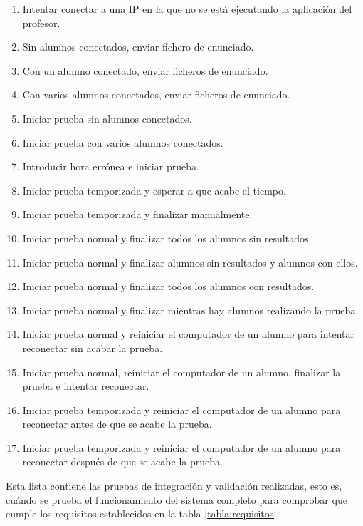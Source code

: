\begin{enumerate}

    \item Intentar conectar a una IP en la que no se está ejecutando la aplicación del profesor.

    \item Sin alumnos conectados, enviar fichero de enunciado.

    \item Con un alumno conectado, enviar ficheros de enunciado.

    \item Con varios alumnos conectados, enviar ficheros de enunciado.


    \item Iniciar prueba sin alumnos conectados.

    \item Iniciar prueba con varios alumnos conectados.


    \item Introducir hora errónea e iniciar prueba.

    \item Iniciar prueba temporizada y esperar a que acabe el tiempo.

    \item Iniciar prueba temporizada y finalizar manualmente.


    \item Iniciar prueba normal y finalizar todos los alumnos sin resultados.

    \item Iniciar prueba normal y finalizar alumnos sin resultados y alumnos con ellos.

    \item Iniciar prueba normal y finalizar todos los alumnos con resultados.

    \item Iniciar prueba normal y finalizar mientras hay alumnos realizando la prueba.



    \item Iniciar prueba normal y reiniciar el computador de un alumno para intentar reconectar sin acabar la prueba.

    \item Iniciar prueba normal, reiniciar el computador de un alumno, finalizar la prueba e intentar reconectar.



    \item Iniciar prueba temporizada y reiniciar el computador de un alumno para reconectar antes de que se acabe la prueba.

    \item Iniciar prueba temporizada y reiniciar el computador de un alumno para reconectar después de que se acabe la prueba.

\end{enumerate}


Esta lista contiene las pruebas de integración y validación realizadas, esto es, cuándo se prueba el funcionamiento del sistema completo para comprobar que cumple los requisitos establecidos en la tabla \ref{tabla:requisitos}.
\newline

